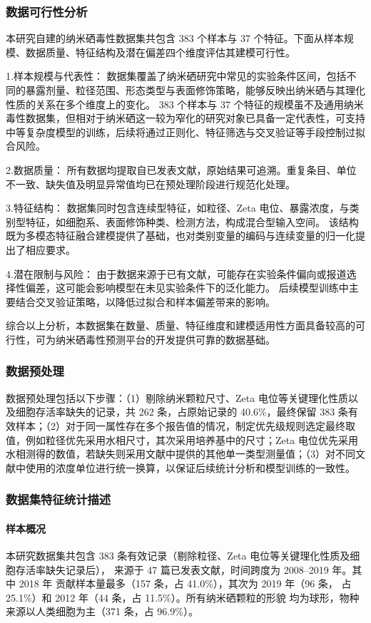 \subsubsection{数据可行性分析}

本研究自建的纳米硒毒性数据集共包含 383 个样本与 37 个特征。下面从样本规模、数据质量、特征结构及潜在偏差四个维度评估其建模可行性。

1.样本规模与代表性：
数据集覆盖了纳米硒研究中常见的实验条件区间，包括不同的暴露剂量、粒径范围、形态类型与表面修饰策略，能够反映出纳米硒与其理化性质的关系在多个维度上的变化。
383 个样本与 37 个特征的规模虽不及通用纳米毒性数据集，但相对于纳米硒这一较为窄化的研究对象已具备一定代表性，可支持中等复杂度模型的训练，后续将通过正则化、特征筛选与交叉验证等手段控制过拟合风险。

2.数据质量：
所有数据均提取自已发表文献，原始结果可追溯。重复条目、单位不一致、缺失值及明显异常值均已在预处理阶段进行规范化处理。

3.特征结构：
数据集同时包含连续型特征，如粒径、Zeta 电位、暴露浓度，与类别型特征，如细胞系、表面修饰种类、检测方法，构成混合型输入空间。
该结构既为多模态特征融合建模提供了基础，也对类别变量的编码与连续变量的归一化提出了相应要求。

4.潜在限制与风险：
由于数据来源于已有文献，可能存在实验条件偏向或报道选择性偏差，这可能会影响模型在未见实验条件下的泛化能力。
后续模型训练中主要结合交叉验证策略，以降低过拟合和样本偏差带来的影响。

综合以上分析，本数据集在数量、质量、特征维度和建模适用性方面具备较高的可行性，可为纳米硒毒性预测平台的开发提供可靠的数据基础。

\subsubsection{数据预处理}

数据预处理包括以下步骤：（1）剔除纳米颗粒尺寸、Zeta 电位等关键理化性质以及细胞存活率缺失的记录，共 262 条，占原始记录的 40.6\%，最终保留 383 条有效样本；（2）对于同一属性存在多个报告值的情况，制定优先级规则选定最终取值，例如粒径优先采用水相尺寸，其次采用培养基中的尺寸；Zeta 电位优先采用水相测得的数值，若缺失则采用文献中提供的其他单一类型测量值；（3）对不同文献中使用的浓度单位进行统一换算，以保证后续统计分析和模型训练的一致性。

\subsubsection{数据集特征统计描述}

\paragraph{样本概况}
本研究数据集共包含 383 条有效记录（剔除粒径、Zeta 电位等关键理化性质及细胞存活率缺失记录后），
来源于 47 篇已发表文献，时间跨度为 2008--2019 年。其中 2018 年
贡献样本量最多（157 条，占 41.0\%），其次为 2019 年（96 条，
占 25.1\%）和 2012 年（44 条，占 11.5\%）。所有纳米硒颗粒的形貌
均为球形，物种来源以人类细胞为主（371 条，占 96.9\%）。

